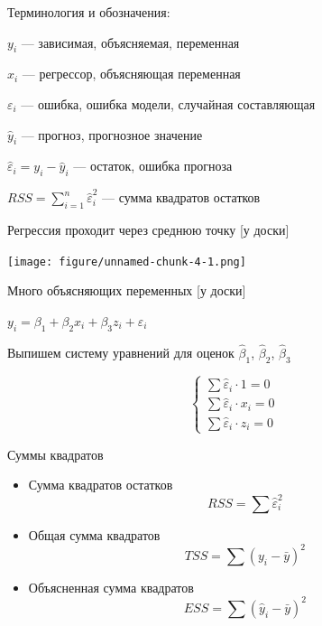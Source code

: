 \documentclass[russian,ignorenonframetext,]{beamer}
\begin{document}
\begin{frame}{Терминология и обозначения:}

\(y_i\) --- зависимая, объясняемая, переменная

\(x_i\) --- регрессор, объясняющая переменная

\(\varepsilon_i\) --- ошибка, ошибка модели, случайная составляющая

\(\hat{y}_i\) --- прогноз, прогнозное значение

\(\hat{\varepsilon}_i=y_i-\hat{y}_i\) --- остаток, ошибка прогноза

\(RSS=\sum_{i=1}^n \hat{\varepsilon}_i^2\) --- сумма квадратов остатков

\end{frame}

\begin{frame}{Регрессия проходит через среднюю точку {[}у доски{]}}

\texttt{[image: figure/unnamed-chunk-4-1.png]}

\end{frame}

\begin{frame}{Много объясняющих переменных {[}у доски{]}}

\(y_i=\beta_1+\beta_2 x_i +\beta_3 z_i+\varepsilon_i\)

Выпишем систему уравнений для оценок \(\hat{\beta}_1\),
\(\hat{\beta}_2\), \(\hat{\beta}_3\)

\[
\begin{cases}
\sum \hat{\varepsilon}_i \cdot 1 =0 \\
\sum \hat{\varepsilon}_i \cdot x_i =0 \\
\sum \hat{\varepsilon}_i \cdot z_i =0
\end{cases}
\]

\end{frame}

\begin{frame}{Суммы квадратов}

\begin{itemize}
\item
  Сумма квадратов остатков \[
  RSS=\sum \hat{\varepsilon}_i^2
  \]
\item
  Общая сумма квадратов \[
  TSS=\sum (y_i-\bar{y})^2
  \]
\item
  Объясненная сумма квадратов \[
  ESS=\sum (\hat{y}_i-\bar{y})^2
  \]
\end{itemize}

\end{frame}
\end{document}
